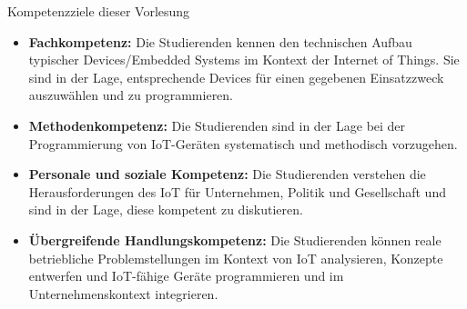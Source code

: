 \begin{frame}{Kompetenzziele dieser Vorlesung}
    \begin{itemize}[<+->]
        \item \textbf{Fachkompetenz:} Die Studierenden kennen den technischen Aufbau typischer
        Devices/Embedded Systems im Kontext der Internet of Things. Sie sind in der Lage,
        entsprechende Devices für einen gegebenen Einsatzzweck auszuwählen und zu programmieren.
        \medskip

        \item \textbf{Methodenkompetenz:} Die Studierenden sind in der Lage bei der Programmierung
        von IoT-Geräten systematisch und methodisch vorzugehen.
        \medskip

        \item \textbf{Personale und soziale Kompetenz:} Die Studierenden verstehen die Herausforderungen
        des IoT für Unternehmen, Politik und Gesellschaft und sind in der Lage, diese kompetent zu diskutieren.
        \medskip

        \item \textbf{Übergreifende Handlungskompetenz:} Die Studierenden können reale betriebliche
        Problemstellungen im Kontext von IoT analysieren, Konzepte entwerfen und IoT-fähige Geräte
        programmieren und im Unternehmenskontext integrieren.
        \medskip
    \end{itemize}
\end{frame}

